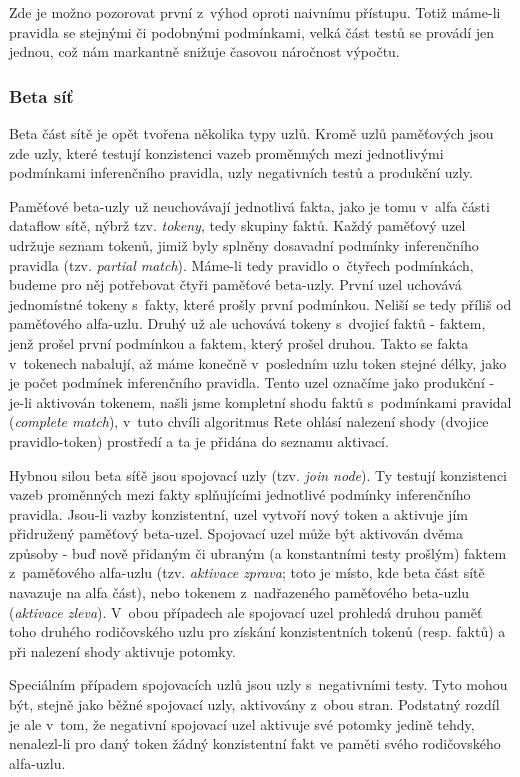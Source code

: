 Zde je možno pozorovat první z~výhod oproti naivnímu přístupu. Totiž
máme-li pravidla se stejnými či podobnými podmínkami, velká část testů
se provádí jen jednou, což nám markantně snižuje časovou náročnost výpočtu.

\subsubsection{Beta síť}
Beta část sítě je opět tvořena několika typy uzlů. Kromě uzlů paměťových
jsou zde uzly, které testují konzistenci vazeb proměnných mezi jednotlivými
podmínkami inferenčního pravidla, uzly negativních testů a produkční uzly.

Paměťové beta-uzly už neuchovávají jednotlivá fakta, jako je tomu v~alfa
části dataflow sítě, nýbrž tzv. \emph{tokeny}, tedy skupiny faktů. Každý
paměťový uzel udržuje seznam tokenů, jimiž byly splněny dosavadní podmínky
inferenčního pravidla (tzv. \emph{partial match}). Máme-li tedy pravidlo
o~čtyřech podmínkách, budeme pro něj potřebovat čtyři paměťové beta-uzly.
První uzel uchovává jednomístné tokeny s~fakty, které prošly první podmínkou.
Neliší se tedy příliš od paměťového alfa-uzlu. Druhý už ale uchovává tokeny
s~dvojicí faktů - faktem, jenž prošel první podmínkou a faktem, který prošel
druhou. Takto se fakta v~tokenech nabalují, až máme konečně v~posledním uzlu
token stejné délky, jako je počet podmínek inferenčního pravidla. Tento uzel
označíme jako produkční - je-li aktivován tokenem, našli jsme kompletní
shodu faktů s~podmínkami pravidal (\emph{complete match}), v~tuto chvíli
algoritmus Rete ohlásí nalezení shody (dvojice pravidlo-token) prostředí
a ta je přidána do seznamu aktivací.

Hybnou silou beta síťě jsou spojovací uzly (tzv. \emph{join node}). Ty
testují konzistenci vazeb proměnných mezi fakty splňujícími jednotlivé
podmínky inferenčního pravidla. Jsou-li vazby konzistentní, uzel vytvoří
nový token a aktivuje jím přidružený paměťový beta-uzel. Spojovací uzel
může být aktivován dvěma způsoby - buď nově přidaným či ubraným
(a konstantními testy prošlým) faktem z~paměťového alfa-uzlu (tzv.
\emph{aktivace zprava}; toto je místo, kde beta část sítě navazuje na alfa
část), nebo tokenem z~nadřazeného paměťového beta-uzlu (\emph{aktivace
zleva}). V~obou případech ale spojovací uzel prohledá druhou paměť toho
druhého rodičovského uzlu pro získání konzistentních tokenů (resp. faktů)
a při nalezení shody aktivuje potomky.

Speciálním případem spojovacích uzlů jsou uzly s~negativními testy. Tyto
mohou být, stejně jako běžné spojovací uzly, aktivovány z~obou stran.
Podstatný rozdíl je ale v~tom, že negativní spojovací uzel aktivuje své
potomky jedině tehdy, nenalezl-li pro daný token žádný konzistentní fakt
ve paměti svého rodičovského alfa-uzlu.

